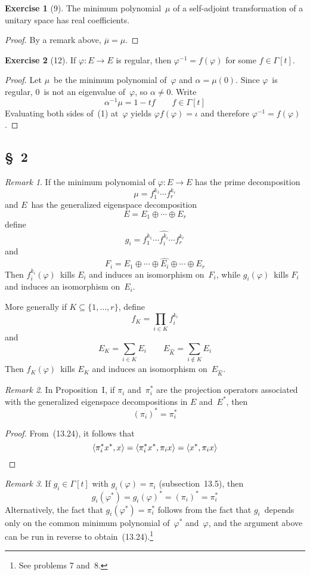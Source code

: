 \documentclass[letterpaper,12pt]{article}
\newcommand{\dsum}{\oplus}
\newcommand{\delete}{\widehat}
\newcommand{\sprod}[2]{\langle#1,#2\rangle}
\newcommand{\conj}[1]{\overline{#1}}
\theoremstyle{definition}
\newtheorem*{exer}{Exercise}
\theoremstyle{remark}
\newtheorem*{rmk}{Remark}
\begin{document}
\begin{exer}[9]
The minimum polynomial~\(\mu\) of a self-adjoint transformation of a unitary space has real coefficients.
\end{exer}
\begin{proof}
By a remark above, \(\conj{\mu}=\mu\).
\end{proof}

\begin{exer}[12]
If \(\varphi:E\to E\) is regular, then \(\varphi^{-1}=f(\varphi)\) for some \(f\in\Gamma[t]\).
\end{exer}
\begin{proof}
Let \(\mu\)~be the minimum polynomial of~\(\varphi\) and \(\alpha=\mu(0)\). Since \(\varphi\)~is regular, \(0\)~is not an eigenvalue of~\(\varphi\), so \(\alpha\ne0\). Write
\[\alpha^{-1}\mu=1-tf\qquad f\in\Gamma[t]\tag{1}\]
Evaluating both sides of~(1) at~\(\varphi\) yields \(\varphi f(\varphi)=\iota\) and therefore \(\varphi^{-1}=f(\varphi)\).
\end{proof}

\subsection*{\S~2}
\begin{rmk}
If the minimum polynomial of \(\varphi:E\to E\) has the prime decomposition
\[\mu=f_1^{k_1}\cdots f_r^{k_r}\]
and \(E\)~has the generalized eigenspace decomposition
\[E=E_1\dsum\cdots\dsum E_r\]
define
\[g_i=f_1^{k_1}\cdots\delete{f_i^{k_i}}\cdots f_r^{k_r}\]
and
\[F_i=E_1\dsum\cdots\dsum\delete{E_i}\dsum\cdots\dsum E_r\]
Then \(f_i^{k_i}(\varphi)\)~kills \(E_i\) and induces an isomorphism on~\(F_i\), while \(g_i(\varphi)\)~kills \(F_i\) and induces an isomorphism on~\(E_i\).

More generally if \(K\subseteq\{1,\ldots,r\}\), define
\[f_K=\prod_{i\in K}f_i^{k_i}\]
and
\[E_K=\sum_{i\in K}E_i\qquad E_{\delete{K}}=\sum_{i\not\in K}E_i\]
Then \(f_K(\varphi)\)~kills \(E_K\) and induces an isomorphism on~\(E_{\delete{K}}\).
\end{rmk}

\begin{rmk}
In Proposition~I, if \(\pi_i\) and~\(\pi^*_i\) are the projection operators associated with the generalized eigenspace decompositions in \(E\) and~\(E^*\), then
\[(\pi_i)^*=\pi^*_i\]
\end{rmk}
\begin{proof}
From~(13.24), it follows that
\[\sprod{\pi^*_i x^*}{x}=\sprod{\pi^*_i x^*}{\pi_i x}=\sprod{x^*}{\pi_i x}\qedhere\]
\end{proof}
\begin{rmk}
If \(g_i\in\Gamma[t]\) with \(g_i(\varphi)=\pi_i\) (subsection~13.5), then
\[g_i(\varphi^*)=g_i(\varphi)^*=(\pi_i)^*=\pi^*_i\]
Alternatively, the fact that \(g_i(\varphi^*)=\pi^*_i\) follows from the fact that \(g_i\)~depends only on the common minimum polynomial of~\(\varphi^*\) and~\(\varphi\), and the argument above can be run in reverse to obtain~(13.24).\footnote{See problems 7 and~8.}
\end{rmk}
\end{document}
